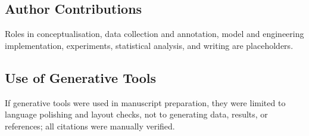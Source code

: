 \subsection*{Author Contributions}
Roles in conceptualisation, data collection and annotation, model and engineering implementation, experiments, statistical analysis, and writing are placeholders. 

\subsection*{Use of Generative Tools}
If generative tools were used in manuscript preparation, they were limited to language polishing and layout checks, not to generating data, results, or references; all citations were manually verified.
